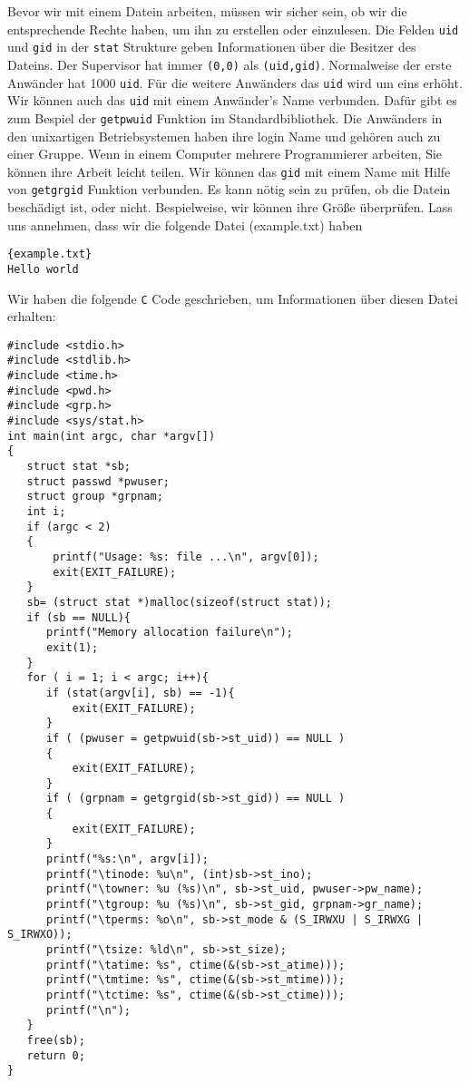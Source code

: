 Bevor wir mit einem Datein arbeiten, müssen wir sicher sein, ob wir die entsprechende Rechte haben, um ihn zu 
erstellen oder einzulesen. Die Felden \texttt{uid} und \texttt{gid} in der \texttt{stat} Strukture geben Informationen 
über die Besitzer des Dateins. Der Supervisor hat immer \texttt{(0,0)} als \texttt{(uid,gid)}. Normalweise der erste Anwänder 
hat 1000 \texttt{uid}. Für die weitere Anwänders das \texttt{uid} wird um eins erhöht. 
Wir können auch das \texttt{uid} mit einem Anwänder's Name verbunden. Dafür gibt es zum Bespiel der \texttt{getpwuid} 
Funktion im Standardbibliothek. Die Anwänders in den unixartigen Betriebsystemen haben ihre login Name und gehören
auch zu einer Gruppe. Wenn in einem Computer mehrere Programmierer arbeiten, Sie können ihre Arbeit leicht teilen. 
Wir können das \texttt{gid} mit einem Name mit Hilfe von \texttt{getgrgid} Funktion verbunden.
Es kann nötig sein zu prüfen, ob die Datein beschädigt ist, oder nicht.  Bespielweise, wir können ihre Größe
überprüfen. Lass uns annehmen, dass wir die folgende Datei (example.txt) haben
\begin{lstlisting}{example.txt}
Hello world
\end{lstlisting}
Wir haben die folgende \texttt{C} Code geschrieben, um Informationen über diesen Datei erhalten:
\begin{lstlisting}
#include <stdio.h>
#include <stdlib.h>
#include <time.h>
#include <pwd.h>
#include <grp.h>
#include <sys/stat.h>
int main(int argc, char *argv[])
{
   struct stat *sb;
   struct passwd *pwuser;
   struct group *grpnam;
   int i;
   if (argc < 2)
   {
       printf("Usage: %s: file ...\n", argv[0]);
       exit(EXIT_FAILURE);
   }
   sb= (struct stat *)malloc(sizeof(struct stat));
   if (sb == NULL){
      printf("Memory allocation failure\n");
      exit(1);
   }
   for ( i = 1; i < argc; i++){
      if (stat(argv[i], sb) == -1){
          exit(EXIT_FAILURE);
      }
      if ( (pwuser = getpwuid(sb->st_uid)) == NULL )
      {
          exit(EXIT_FAILURE);
      }
      if ( (grpnam = getgrgid(sb->st_gid)) == NULL )
      {
          exit(EXIT_FAILURE);
      }
      printf("%s:\n", argv[i]);
      printf("\tinode: %u\n", (int)sb->st_ino);
      printf("\towner: %u (%s)\n", sb->st_uid, pwuser->pw_name);
      printf("\tgroup: %u (%s)\n", sb->st_gid, grpnam->gr_name);
      printf("\tperms: %o\n", sb->st_mode & (S_IRWXU | S_IRWXG | S_IRWXO));
      printf("\tsize: %ld\n", sb->st_size);
      printf("\tatime: %s", ctime(&(sb->st_atime)));
      printf("\tmtime: %s", ctime(&(sb->st_mtime)));
      printf("\tctime: %s", ctime(&(sb->st_ctime)));
      printf("\n");
   }
   free(sb);
   return 0;
}
\end{lstlisting}
